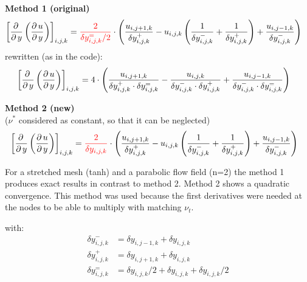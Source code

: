 \documentclass[11pt,a4paper]{article}
\begin{document}
\vspace{0.5cm}

\noindent\textbf{Method 1 (original)}
\begin{align*}
\left[ \frac{\partial \, }{\partial \, y}\left( \frac{\partial \, u}{\partial \, y} \right) \right]_{i,j,k}&=
\textcolor{red}{
\frac{2}{\delta y_{i,j,k}^=/2}
}
\cdot
\left(
\frac{u_{i,j+1,k}}{\delta y_{i,j,k}^+}
-
u_{i,j,k}\left(
\frac{1}{\delta y_{i,j,k}^-}
+
\frac{1}{\delta y_{i,j,k}^+} \right)
+
\frac{u_{i,j-1,k}}{\delta y_{i,j,k}^-}
\right)
\end{align*}
rewritten (as in the code):
\begin{align*}
\left[ \frac{\partial \, }{\partial \, y}\left( \frac{\partial \, u}{\partial \, y} \right) \right]_{i,j,k}
&=
4
\cdot
\left(
\frac{u_{i,j+1,k}}{\delta y_{i,j,k}^+\cdot \delta y_{i,j,k}^=}
-
\frac{
u_{i,j,k}
}{
\delta y_{i,j,k}^-\cdot \delta y_{i,j,k}^+
}
+
\frac{u_{i,j-1,k}}{\delta y_{i,j,k}^-\cdot \delta y_{i,j,k}^=}
\right)
\end{align*}

\vspace{0.5cm}

\noindent\textbf{Method 2 (new)}\\
\noindent($\nu^*$ considered as constant, so that it can be neglected)
\begin{align*}
&\left[ \frac{\partial \, }{\partial \, y}\left( \frac{\partial \, u}{\partial \, y} \right) \right]_{i,j,k}=
\textcolor{red}{
\frac{2}{\delta y_{i,j,k}}
}\cdot
\left(
\frac{u_{i,j+1,k}}{\delta y_{i,j,k}^+}
-
u_{i,j,k}\left(
\frac{1}{\delta y_{i,j,k}^-}
+
\frac{1}{\delta y_{i,j,k}^+} \right)
+
\frac{u_{i,j-1,k}}{\delta y_{i,j,k}^-}
\right)
\end{align*}

\vspace{0.5cm}

\noindent For a stretched mesh (tanh) and a parabolic flow field (n=2) the method 1 produces exact results in contrast to method 2. Method 2 shows a quadratic convergence. This method was used because the first derivatives were needed at the nodes to be able to multiply with matching $\nu_t$.

\vfill
with:
\begin{align*}
\delta y_{i,j,k}^- &= \delta y_{i,j-1,k}+\delta y_{i,j,k} \\
\delta y_{i,j,k}^+ &= \delta y_{i,j+1,k}+\delta y_{i,j,k} \\
\delta y_{i,j,k}^=&=\delta y_{i,j,k}/2+ \delta y_{i,j,k}+\delta y_{i,j,k}/2
\end{align*}

\clearpage
\end{document}
